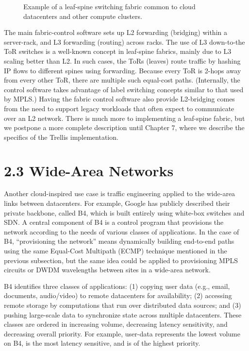 \documentclass[letterpaper,11pt,english]{sphinxmanual}
\let\sphinxpxdimen\pdfpxdimen\else\newdimen\sphinxpxdimen
\begin{document}
\begin{figure}[htbp]
\centering
\capstart

\noindent\sphinxincludegraphics[width=400\sphinxpxdimen]{{Slide20}.png}
\caption{Example of a leaf-spine switching fabric common to cloud
datacenters and other compute clusters.}\label{\detokenize{uses:id3}}\label{\detokenize{uses:fig-leaf-spine}}\end{figure}

The main fabric-control software sets up L2 forwarding (bridging)
within a server-rack, and L3 forwarding (routing) across racks. The
use of L3 down-to-the ToR switches is a well-known concept in
leaf-spine fabrics, mainly due to L3 scaling better than L2. In
such cases, the ToRs (leaves) route traffic by hashing IP flows to
different spines using  forwarding.
Because every ToR is 2-hops away from every other ToR, there are
multiple such equal-cost paths. (Internally, the control software
takes advantage of label switching concepts similar to that used by
MPLS.) Having the fabric control software also provide L2-bridging
comes from the need to support legacy workloads that often expect to
communicate over an L2 network. There is much more to implementing a
leaf-spine fabric, but we postpone a more complete description until
Chapter 7, where we describe the specifics of the Trellis
implementation.


\section{2.3 Wide-Area Networks}
\label{\detokenize{uses:wide-area-networks}}
Another cloud-inspired use case is traffic engineering applied to the
wide-area links between datacenters. For example, Google has publicly
described their private backbone, called B4, which is built entirely
using white-box switches and SDN. A central component of B4 is a
 control program that provisions the network
according to the needs of various classes of applications. In the case
of B4, “provisioning the network” means dynamically building
end-to-end paths using the same Equal-Cost Multipath (ECMP) technique
mentioned in the previous subsection, but the same idea could be
applied to provisioning MPLS circuits or DWDM wavelengths between
sites in a wide-area network.

B4 identifies three classes of applications: (1) copying user data
(e.g., email, documents, audio/video) to remote datacenters for
availability; (2) accessing remote storage by computations that run
over distributed data sources; and (3) pushing large-scale data to
synchronize state across multiple datacenters. These classes are
ordered in increasing volume, decreasing latency sensitivity, and
decreasing overall priority. For example, user-data represents the
lowest volume on B4, is the most latency sensitive, and is of the
highest priority.
\end{document}

